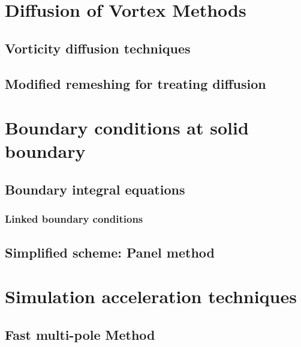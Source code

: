\section{Diffusion of Vortex Methods}

\subsection{Vorticity diffusion techniques}

\subsection{Modified remeshing for treating diffusion}


\section{Boundary conditions at solid boundary}

\subsection{Boundary integral equations}

\subsubsection{Linked boundary conditions}

\subsection{Simplified scheme: Panel method}

\section{Simulation acceleration techniques}

\subsection{Fast multi-pole Method}

